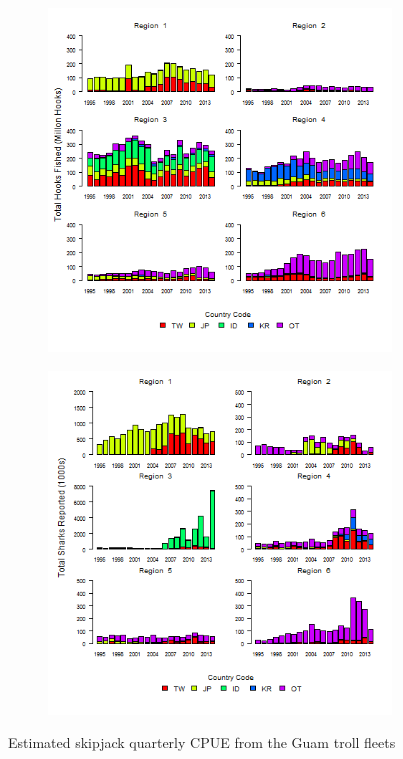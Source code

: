 \documentclass[12pt]{SCreport}
\begin{document}
\begin{figure}
\centering
   \begin{subfigure}[b]{0.2\textwidth}
       \includegraphics[width=\textwidth]{../GRAPHICS/Defined/FIG_04a_LLeff_FLAG_RDS}
   \end{subfigure}
   \begin{subfigure}[b]{0.2\textwidth}
       \includegraphics[width=\textwidth]{../GRAPHICS/Defined/FIG_04b_LLreported_catch_FLAG_RDS}
   \end{subfigure}
\caption{Estimated skipjack quarterly CPUE from the Guam troll fleets}\label{fig:Guam cpue}
\end{figure}
\end{document}
